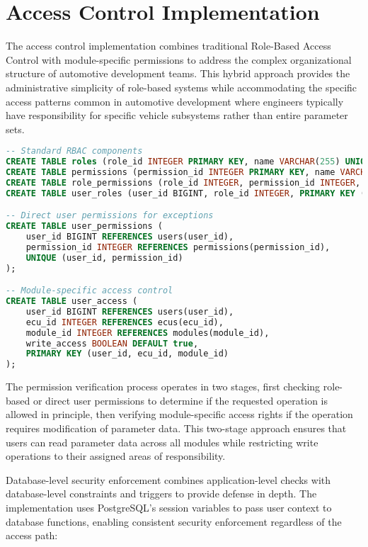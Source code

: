 \section{Access Control Implementation}
\label{sec:access-control-implementation}

The access control implementation combines traditional Role-Based Access Control with module-specific permissions to address the complex organizational structure of automotive development teams. This hybrid approach provides the administrative simplicity of role-based systems while accommodating the specific access patterns common in automotive development where engineers typically have responsibility for specific vehicle subsystems rather than entire parameter sets.

\begin{lstlisting}[language=SQL, caption={Hybrid Access Control Structure}, label={lst:access-control}]
-- Standard RBAC components
CREATE TABLE roles (role_id INTEGER PRIMARY KEY, name VARCHAR(255) UNIQUE);
CREATE TABLE permissions (permission_id INTEGER PRIMARY KEY, name VARCHAR(255) UNIQUE);
CREATE TABLE role_permissions (role_id INTEGER, permission_id INTEGER, PRIMARY KEY (role_id, permission_id));
CREATE TABLE user_roles (user_id BIGINT, role_id INTEGER, PRIMARY KEY (user_id, role_id));

-- Direct user permissions for exceptions
CREATE TABLE user_permissions (
    user_id BIGINT REFERENCES users(user_id),
    permission_id INTEGER REFERENCES permissions(permission_id),
    UNIQUE (user_id, permission_id)
);

-- Module-specific access control
CREATE TABLE user_access (
    user_id BIGINT REFERENCES users(user_id),
    ecu_id INTEGER REFERENCES ecus(ecu_id),
    module_id INTEGER REFERENCES modules(module_id),
    write_access BOOLEAN DEFAULT true,
    PRIMARY KEY (user_id, ecu_id, module_id)
);
\end{lstlisting}

The permission verification process operates in two stages, first checking role-based or direct user permissions to determine if the requested operation is allowed in principle, then verifying module-specific access rights if the operation requires modification of parameter data. This two-stage approach ensures that users can read parameter data across all modules while restricting write operations to their assigned areas of responsibility.

Database-level security enforcement combines application-level checks with database-level constraints and triggers to provide defense in depth. The implementation uses PostgreSQL's session variables to pass user context to database functions, enabling consistent security enforcement regardless of the access path:

